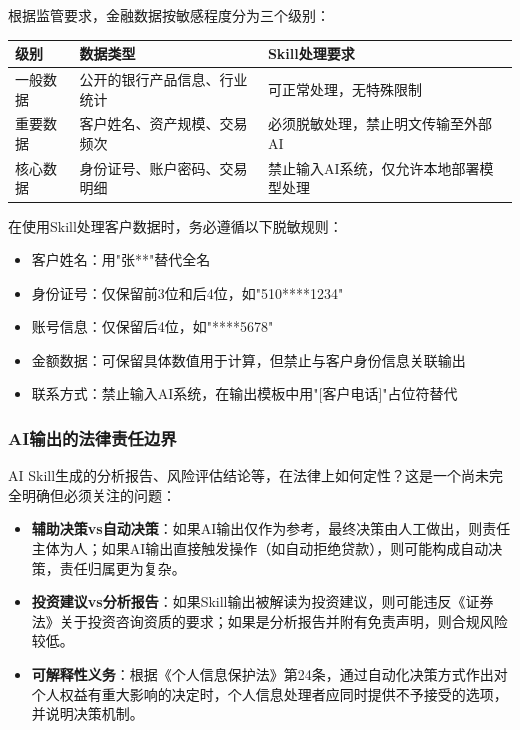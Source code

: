 根据监管要求，金融数据按敏感程度分为三个级别：

\begin{table}[H]
\centering
\begin{tabular}{lp{4cm}p{6cm}}
\toprule
\textbf{级别} & \textbf{数据类型} & \textbf{Skill处理要求} \\
\midrule
一般数据 & 公开的银行产品信息、行业统计 & 可正常处理，无特殊限制 \\
重要数据 & 客户姓名、资产规模、交易频次 & 必须脱敏处理，禁止明文传输至外部AI \\
核心数据 & 身份证号、账户密码、交易明细 & 禁止输入AI系统，仅允许本地部署模型处理 \\
\bottomrule
\end{tabular}
\end{table}

\begin{warningbox}[数据脱敏实操要点]
在使用Skill处理客户数据时，务必遵循以下脱敏规则：
\begin{itemize}[leftmargin=1em]
  \item 客户姓名：用"张**"替代全名
  \item 身份证号：仅保留前3位和后4位，如"510****1234"
  \item 账号信息：仅保留后4位，如"****5678"
  \item 金额数据：可保留具体数值用于计算，但禁止与客户身份信息关联输出
  \item 联系方式：禁止输入AI系统，在输出模板中用"[客户电话]"占位符替代
\end{itemize}
\end{warningbox}

\subsubsection{AI输出的法律责任边界}

AI Skill生成的分析报告、风险评估结论等，在法律上如何定性？这是一个尚未完全明确但必须关注的问题：

\begin{itemize}[leftmargin=2em]
  \item \textbf{辅助决策vs自动决策}：如果AI输出仅作为参考，最终决策由人工做出，则责任主体为人；如果AI输出直接触发操作（如自动拒绝贷款），则可能构成自动决策，责任归属更为复杂。
  \item \textbf{投资建议vs分析报告}：如果Skill输出被解读为投资建议，则可能违反《证券法》关于投资咨询资质的要求；如果是分析报告并附有免责声明，则合规风险较低。
  \item \textbf{可解释性义务}：根据《个人信息保护法》第24条，通过自动化决策方式作出对个人权益有重大影响的决定时，个人信息处理者应同时提供不予接受的选项，并说明决策机制。
\end{itemize}

